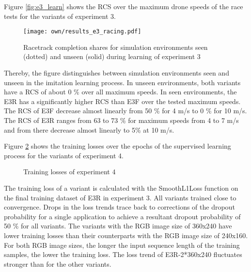 Figure \ref{fig:e3_learn} shows the 
RCS over the maximum drone speeds
of the race tests for the variants of experiment 3.
\begin{figure}
    \centering
    \texttt{[image: own/results\_e3\_racing.pdf]}
    \caption[
        Racetrack completion shares of experiment 3
    ]{
        Racetrack completion shares
        for simulation environments
        seen (dotted) and unseen (solid) during learning
        of experiment 3
    \label{fig:e3_racing}}
\end{figure}
Thereby, the figure 
distinguishes between simulation environments seen and unseen in the imitation learning process.
In unseen environments, both variants have a RCS of about 0 \% over all maximum speeds.
In seen environments,
the E3R has a significantly higher RCS than E3F over the tested maximum speeds.
The RCS of E3F decrease almost linearly from 50 \% for 4 m/s
to 0 \% for 10 m/s.
The RCS of E3R ranges from 63 to 73 \% for maximum speeds from 4 to 7 m/s
and from there decrease almost linearly to 5\% at 10 m/s.





Figure \ref{fig:e4_learn} shows the 
training losses over the epochs of the supervised learning process for the variants of experiment 4.
\begin{figure}
    \centering
    \hspace*{0cm}
    \par
    \caption[
        Training losses of experiment 4
    ]{
        Training losses of experiment 4
        \label{fig:e4_learn}
    }
\end{figure}
The training loss of a variant is calculated 
with the SmoothL1Loss function
on the final training dataset of E3R in experiment 3.
All variants trained close to convergence.
Drops in the loss trends trace back to corrections
of the dropout probability for a single application
to achieve a resultant dropout probability of 50 \% for all variants.
The variants with the RGB image size of 360x240 
have lower training losses than their counterparts 
with the RGB image size of 240x160.
For both RGB image sizes, the longer the input sequence length 
of the training samples, the lower the training loss.
The loss trend of E3R-2*360x240 fluctuates stronger than for the other variants.




